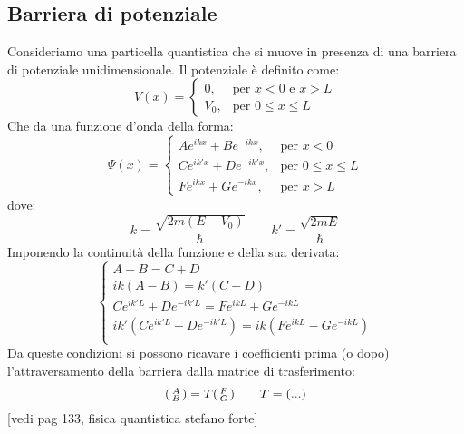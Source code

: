 \documentclass{article}
\begin{document}
\subsection{Barriera di potenziale}
Consideriamo una particella quantistica che si muove in presenza di una barriera di potenziale unidimensionale. Il potenziale è definito come:
$$
V(x) = 
\begin{cases}
0, & \text{per } x < 0 \text{ e } x > L \\
V_0, & \text{per } 0 \leq x \leq L
\end{cases}
$$
Che da una funzione d'onda della forma:
$$
\Psi(x) = 
\begin{cases}
Ae^{ikx} + Be^{-ikx}, & \text{per } x < 0 \\
Ce^{ik'x} + De^{-ik'x}, & \text{per } 0 \leq x \leq L \\
Fe^{ikx} + Ge^{-ikx}, & \text{per } x > L
\end{cases}
$$
dove:
$$k = \frac{{\sqrt{{2m(E - V_0)}}}}{{\hbar}} \qquad k' = \frac{{\sqrt{{2mE}}}}{{\hbar}}$$
Imponendo la continuità della funzione e della sua derivata:
$$\begin{cases}
    A + B = C + D\\
    ik(A - B) = k'(C - D)\\
    C e^{ik'L} + D e^{-ik'L} = F e^{ikL} + G e^{-ikL}\\
    ik' (C e^{ik'L} - D e^{-ik'L}) = ik (F e^{ikL} - G e^{-ikL})\\
\end{cases}$$
Da queste condizioni si possono ricavare i coefficienti prima (o dopo) l'attraversamento della barriera dalla matrice di trasferimento:
$$ \begin{psmallmatrix}A\\B\end{psmallmatrix}=T\begin{psmallmatrix}F\\G\end{psmallmatrix} \qquad T=(...) $$
[vedi pag 133, fisica quantistica stefano forte]



\end{document}
